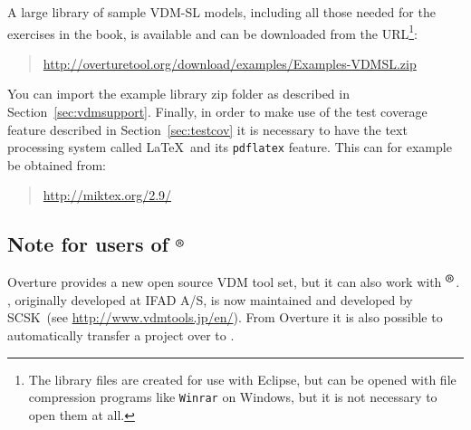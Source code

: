 A large library of sample VDM-SL models, including all those needed for the exercises in the book, is available and can be downloaded from the URL\footnote{The library files are created for use with Eclipse, but can be opened with file compression programs like \texttt{Winrar} on Windows, but it is not necessary to open them at all.}:
%
\begin{quote}
\url{http://overturetool.org/download/examples/Examples-VDMSL.zip}
\end{quote}
%
You can import the example library zip folder as described in Section~\ref{sec:vdmsupport}.  Finally, in order to make use of the test coverage feature described in Section~\ref{sec:testcov} it is necessary to have the text processing system called \LaTeX\ and its \texttt{pdflatex} feature. This can for example be obtained from:
%
\begin{quote}
\url{http://miktex.org/2.9/}
\end{quote}
%
\subsection*{Note for users of \vdmtools$^{\mbox{\small\textbf{{\textregistered}}}}$}
Overture provides a new open source VDM tool set, but it can also work with \vdmtools$^{\mbox{\small\textbf{{\textregistered}}}}$. \vdmtools, originally developed at IFAD A/S, is now maintained and developed by SCSK~(see \url{http://www.vdmtools.jp/en/}). From Overture it is also possible to automatically transfer a project over to \vdmtools.
%
